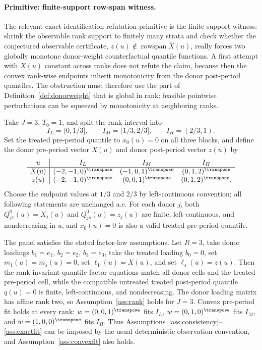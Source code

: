 \paragraph{Primitive: finite-support row-span witness.}
The relevant exact-identification refutation primitive is the finite-support witness: shrink the observable rank support to finitely many strata and check whether the conjectured observable certificate, \(z(u)\notin\operatorname{rowspan}\bar X(u)\), really forces two globally monotone donor-weight counterfactual quantile functions.
A first attempt with \(X(u)\) constant across ranks does not refute the claim, because then the convex rank-wise endpoints inherit monotonicity from the donor post-period quantiles.
The obstruction must therefore use the part of Definition~\ref{def:donorweight} that is global in rank: feasible pointwise perturbations can be squeezed by monotonicity at neighboring ranks.

Take \(J=3\), \(T_0=1\), and split the rank interval into
\[
I_L=(0,1/3],\qquad I_M=(1/3,2/3],\qquad I_H=(2/3,1).
\]
Set the treated pre-period quantile to \(x_0(u)=0\) on all three blocks, and define the donor pre-period vector \(X(u)\) and donor post-period vector \(z(u)\) by
\[
\begin{array}{c|ccc}
u & I_L & I_M & I_H\\ \hline
X(u) & (-2,-1,0)^\transpose & (-1,0,1)^\transpose & (0,1,2)^\transpose\\
z(u) & (-2,-1,0)^\transpose & (0,0,1)^\transpose & (0,1,2)^\transpose .
\end{array}
\]
Choose the endpoint values at \(1/3\) and \(2/3\) by left-continuous convention; all following statements are unchanged a.e.
For each donor \(j\), both \(Q^0_{j1}(u)=X_j(u)\) and \(Q^0_{js}(u)=z_j(u)\) are finite, left-continuous, and nondecreasing in \(u\), and \(x_0(u)=0\) is also a valid treated pre-period quantile.

The panel satisfies the stated factor-law assumptions.
Let \(R=3\), take donor loadings \(b_1=e_1\), \(b_2=e_2\), \(b_3=e_3\), take the treated loading \(b_0=0\), set \(m_1(u)=m_s(u)=0\), set \(\ell_1(u)=X(u)\), and set \(\ell_s(u)=z(u)\).
Then the rank-invariant quantile-factor equations match all donor cells and the treated pre-period cell, while the compatible untreated treated post-period quantile \(q(u)=0\) is finite, left-continuous, and nondecreasing.
The donor loading matrix has affine rank two, so Assumption~\ref{ass:rank} holds for \(J=3\).
Convex pre-period fit holds at every rank: \(w=(0,0,1)^\transpose\) fits \(I_L\), \(w=(0,1,0)^\transpose\) fits \(I_M\), and \(w=(1,0,0)^\transpose\) fits \(I_H\).
Thus Assumptions~\ref{ass:consistency}--\ref{ass:exactfit} can be imposed by the usual deterministic observation convention, and Assumption~\ref{ass:convexfit} also holds.

